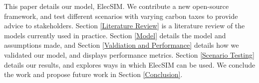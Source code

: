 This paper details our model, ElecSIM. We contribute a new open-source framework, and test different scenarios with varying carbon taxes to provide advice to stakeholders. Section \ref{Literature Review} is a literature review of the models currently used in practice. Section \ref{Model} details the model and assumptions made, and Section \ref{Valdiation and Performance} details how we validated our model, and displays performance metrics. Section \ref{Scenario Testing} details our results, and explores ways in which ElecSIM can be used. We conclude the work and propose future work in Section \ref{Conclusion}.


